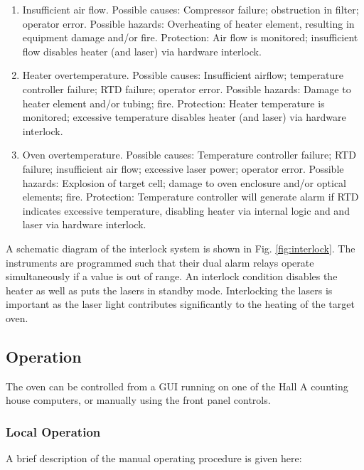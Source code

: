 {\begin{safetyen}{10}{5}
\begin{enumerate}
\item Insufficient air flow. Possible causes: Compressor failure;
obstruction
  in filter; operator error. Possible hazards: Overheating of heater
element,
  resulting in equipment damage and/or fire.
  Protection: Air flow is monitored; insufficient flow disables heater
  (and laser) via hardware interlock.
\item Heater overtemperature. Possible causes: Insufficient airflow;
  temperature controller failure; RTD failure; operator error.
  Possible hazards: Damage to heater element and/or tubing; fire.
  Protection: Heater temperature is monitored; excessive temperature
  disables heater (and laser) via hardware interlock.
\item Oven overtemperature. Possible causes: Temperature controller
failure;
  RTD failure; insufficient air flow; excessive laser power; 
  operator error. Possible hazards: Explosion of target cell; damage
  to oven enclosure and/or optical elements; fire.
  Protection: Temperature controller will generate alarm if RTD
indicates
  excessive temperature, disabling heater via internal logic and 
  and laser via hardware interlock. 
\end{enumerate}

A schematic diagram of 
the interlock system is shown in Fig. \ref{fig:interlock}.
The instruments are programmed such that their dual alarm relays
operate simultaneously if a value is out of range.
An interlock condition disables the heater as well as puts the
lasers in standby mode. Interlocking the
lasers is important as the laser light contributes significantly to
the heating of the target oven. 

\end{safetyen}

\subsection{Operation}
The oven can be controlled from a GUI running
on one of the Hall A counting house computers, or manually using the
front panel controls. 

\subsubsection{Local Operation}
A brief description of the manual operating procedure is given here:

}
